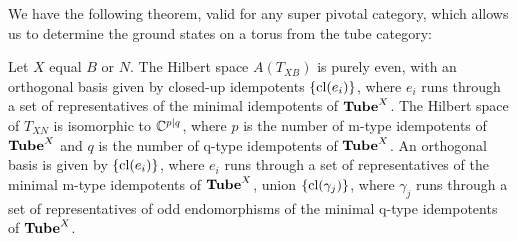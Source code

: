 We have the following theorem, valid for any super pivotal category, which allows us to determine 
the ground states on a torus from the tube category:

\begin{theorem} \label{torus_basis_theorem}
Let $X$ equal $B$ or $N$.
The Hilbert space $A(T_{XB})$ is purely even, with an orthogonal basis given by closed-up idempotents $\{\text{cl}(e_i)\}$,
where $e_i$ runs through a set of representatives of the minimal idempotents of $\textbf{Tube}^X$.
The Hilbert space of $T_{XN}$ is isomorphic to $\mathbb{C}^{p|q}$, where $p$ is the number of m-type idempotents of $\textbf{Tube}^X$
and $q$ is the number of q-type idempotents of $\textbf{Tube}^X$.
An orthogonal basis is given by $\{\text{cl}(e_i)\}$, where $e_i$ runs through a set of 
representatives of the minimal m-type idempotents of $\textbf{Tube}^X$,
union $\{\text{cl}(\gamma_j)\}$,
where $\gamma_j$ runs through a set of representatives of odd endomorphisms of the minimal q-type idempotents of $\textbf{Tube}^X$.
\end{theorem}


